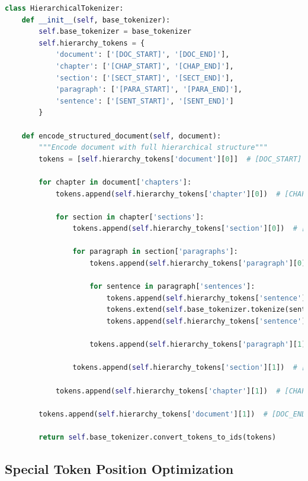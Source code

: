 \begin{lstlisting}[language=Python, caption=Hierarchical special token insertion]
class HierarchicalTokenizer:
    def __init__(self, base_tokenizer):
        self.base_tokenizer = base_tokenizer
        self.hierarchy_tokens = {
            'document': ['[DOC_START]', '[DOC_END]'],
            'chapter': ['[CHAP_START]', '[CHAP_END]'],
            'section': ['[SECT_START]', '[SECT_END]'],
            'paragraph': ['[PARA_START]', '[PARA_END]'],
            'sentence': ['[SENT_START]', '[SENT_END]']
        }
    
    def encode_structured_document(self, document):
        """Encode document with full hierarchical structure"""
        tokens = [self.hierarchy_tokens['document'][0]]  # [DOC_START]
        
        for chapter in document['chapters']:
            tokens.append(self.hierarchy_tokens['chapter'][0])  # [CHAP_START]
            
            for section in chapter['sections']:
                tokens.append(self.hierarchy_tokens['section'][0])  # [SECT_START]
                
                for paragraph in section['paragraphs']:
                    tokens.append(self.hierarchy_tokens['paragraph'][0])  # [PARA_START]
                    
                    for sentence in paragraph['sentences']:
                        tokens.append(self.hierarchy_tokens['sentence'][0])  # [SENT_START]
                        tokens.extend(self.base_tokenizer.tokenize(sentence))
                        tokens.append(self.hierarchy_tokens['sentence'][1])  # [SENT_END]
                    
                    tokens.append(self.hierarchy_tokens['paragraph'][1])  # [PARA_END]
                
                tokens.append(self.hierarchy_tokens['section'][1])  # [SECT_END]
            
            tokens.append(self.hierarchy_tokens['chapter'][1])  # [CHAP_END]
        
        tokens.append(self.hierarchy_tokens['document'][1])  # [DOC_END]
        
        return self.base_tokenizer.convert_tokens_to_ids(tokens)
\end{lstlisting}

\subsection{Special Token Position Optimization}

